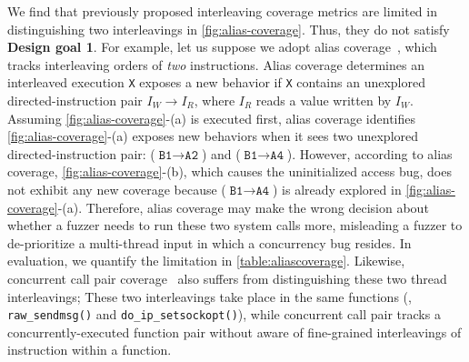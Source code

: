 %
We find that previously proposed interleaving coverage metrics are
limited in distinguishing two interleavings in
\autoref{fig:alias-coverage}.  Thus, they do not satisfy
\textbf{Design goal 1}.
%
For example, let us suppose we adopt alias coverage~\cite{krace},
which tracks interleaving orders of \textit{two} instructions.
%
Alias coverage determines an interleaved execution \texttt{X} exposes
a new behavior if \texttt{X} contains an unexplored
directed-instruction pair $I_W \rightarrow I_R$, where $I_R$ reads a
value written by $I_W$.
%
Assuming \autoref{fig:alias-coverage}-(a) is executed first, alias
coverage identifies \autoref{fig:alias-coverage}-(a) exposes new
behaviors when it sees two unexplored directed-instruction pair:
($\texttt{B1} \rightarrow \texttt{A2}$) and
($\texttt{B1} \rightarrow \texttt{A4}$).
%
However, according to alias coverage,
\autoref{fig:alias-coverage}-(b), which causes the uninitialized
access bug, does not exhibit any new coverage because
($\texttt{B1} \rightarrow \texttt{A4}$) is already explored in
\autoref{fig:alias-coverage}-(a).
%
%
Therefore, alias coverage may make the wrong decision about whether a
fuzzer needs to run these two system calls more, misleading a fuzzer
to de-prioritize a multi-thread input in which a concurrency bug
resides. In evaluation, we quantify the limitation in
\autoref{table:aliascoverage}.
%
Likewise, concurrent call pair coverage~\cite{conzzer} also suffers
from distinguishing these two thread interleavings;
%
These two interleavings take place in the same functions (\ie,
\texttt{raw_sendmsg()} and \texttt{do_ip_setsockopt()}), while
concurrent call pair tracks a concurrently-executed function pair
without aware of fine-grained interleavings of instruction within a
function.

